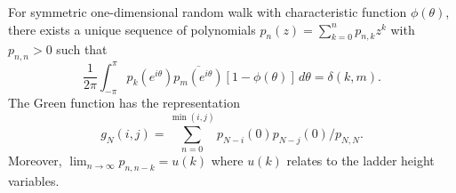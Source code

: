 For symmetric one-dimensional random walk with characteristic function \(\phi(\theta)\), there exists a unique sequence of polynomials \(p_n(z) = \sum_{k=0}^{n} p_{n,k} z^k\) with \(p_{n,n} > 0\) such that
\[
\frac{1}{2\pi} \int_{-\pi}^{\pi} p_k(e^{i\theta}) \overline{p_m(e^{i\theta})} [1 - \phi(\theta)] \, d\theta = \delta(k,m).
\]
The Green function has the representation
\[
g_N(i,j) = \sum_{n=0}^{\min(i,j)} p_{N-i}(0) p_{N-j}(0) / p_{N,N}.
\]
Moreover, \(\lim_{n \to \infty} p_{n,n-k} = u(k)\) where \(u(k)\) relates to the ladder height variables.
